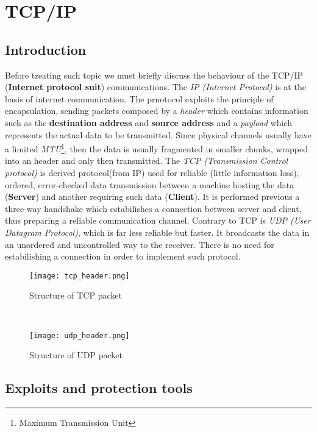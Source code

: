 \documentclass[../../main.tex]{subfiles}
\begin{document}
    

\section{TCP/IP}
\subsection{Introduction}
Before treating such topic we must briefly discuss the behaviour of the
TCP/IP (\textbf{Internet protocol suit}) communications. The \emph{IP (Internet Protocol)} is at the basis of internet
communication. The prnotocol exploits the principle of encapsulation, sending
packets composed by a \emph{header} which contains information such as the
\textbf{destination address} and \textbf{source address} and a
\emph{payload} which represents the actual data to be transmitted.
Since physical channels usually have a limited \emph{MTU}\footnote{Maximum
Transmission Unit}, then the data is usually fragmented in smaller chunks,
wrapped into an header and only then transmitted. The \emph{TCP (Transmission Control protocol)} is derived protocol(from IP) used for
reliable (little information loss), ordered, error-checked data transmission
between a machine hosting the data (\textbf{Server}) and another requiring
such data (\textbf{Client}). It is performed previous a three-way handshake
which estabilishes a connection between server and client, thus preparing a
reliable communication channel. Contrary to TCP is \emph{UDP (User Datagram Protocol)}, which is far less
reliable but faster. It broadcasts the data in an unordered and uncontrolled way to the receiver. 
There is no need for estabilishing a connection in order to implement such
protocol.

\begin{figure*}[h]
    \centering
    \begin{subfigure}{.45\textwidth}
        \centering
        \texttt{[image: tcp\_header.png]}
        \caption{Structure of TCP packet}
    \end{subfigure}%
    ~
    \begin{subfigure}{.45\textwidth}
        \centering
        \texttt{[image: udp\_header.png]}
        \caption{Structure of UDP packet}
    \end{subfigure}
\end{figure*}

\subsection{Exploits and protection tools}
\end{document}
